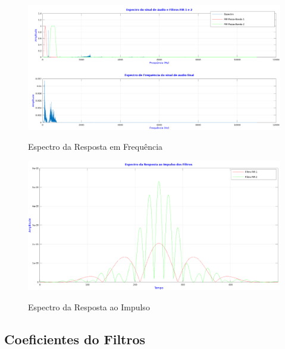 \documentclass[12pt,fleqn]{article}
\begin{document}
\begin{figure}[!htb]
    \centering
    \includegraphics[scale=0.4]{fig/sinal5.png}
    \label{figura:figura11}
    \caption{Espectro da Resposta em Frequência}
\end{figure}

\begin{figure}[!htb]
    \centering
    \includegraphics[scale=0.4]{fig/sinal6.png}
    \label{figura:figura12}
    \caption{Espectro da Resposta ao Impulso}
\end{figure}

\newpage
\subsection{Coeficientes do Filtros}
\end{document}
